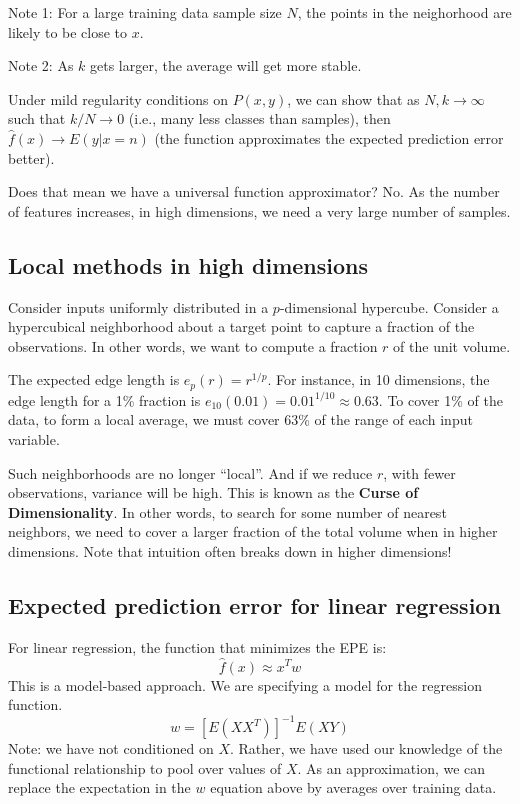 \documentclass[a4paper,12pt]{article}
\begin{document}
Note 1: For a large training data sample size $N$, the points in the neighorhood are likely to be close to $x$. 

Note 2: As $k$ gets larger, the average will get more stable. 

Under mild regularity conditions on $P(x,y)$, we can show that as $N,k\rightarrow \infty$ such that $k/N\rightarrow0$ (i.e., many less classes than samples), then $\hat f(x) \rightarrow E(y|x=n)$ (the function approximates the expected prediction error better).

Does that mean we have a universal function approximator? No. As the number of features increases, in high dimensions, we need a very large number of samples. 

\subsection{Local methods in high dimensions}

Consider inputs uniformly distributed in a $p$-dimensional hypercube. Consider a hypercubical neighborhood about a target point to capture a fraction of the observations. In other words, we want to compute a fraction $r$ of the unit volume. 

The expected edge length is $e_p(r) = r^{1/p}$. For instance, in 10 dimensions, the edge length for a 1\% fraction is $e_{10}(0.01) = 0.01^{1/10} \approx 0.63$. To cover 1\% of the data, to form a local average, we must cover 63\% of the range of each input variable. 

Such neighborhoods are no longer ``local''. And if we reduce $r$, with fewer observations, variance will be high. This is known as the \textbf{Curse of Dimensionality}. In other words, to search for some number of nearest neighbors, we need to cover a larger fraction of the total volume when in higher dimensions. Note that intuition often breaks down in higher dimensions! 

\subsection{Expected prediction error for linear regression}

For linear regression, the function that minimizes the EPE is: 
$$\hat f(x) \approx x^Tw$$
This is a model-based approach. We are specifying a model for the regression function. 
$$w = [E(XX^T)]^{-1} E(XY)$$
Note: we have not conditioned on $X$. Rather, we have used our knowledge of the functional relationship to pool over values of $X$. As an approximation, we can replace the expectation in the $w$ equation above by averages over training data. 
\end{document}
